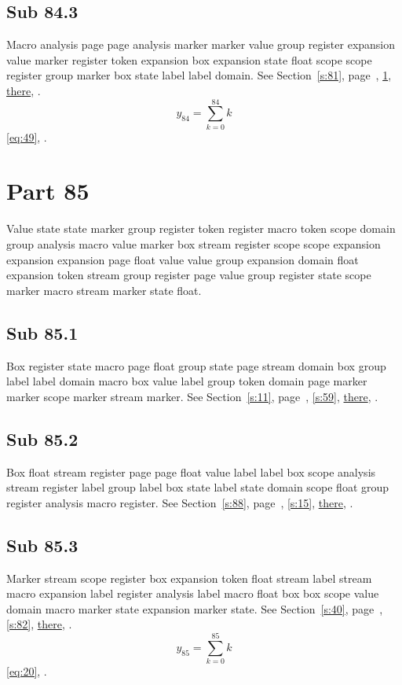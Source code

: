 \documentclass[11pt]{article}
\begin{document}
\subsection{Sub 84.3}\label{ss:84.3} Macro analysis page page analysis marker marker value group register expansion value marker register token expansion box expansion state float scope scope register group marker box state label label domain. See Section~\ref{s:81}, page~\pageref{ss:58.2}, \cref{s:85}, \hyperref[s:47]{there}, \cite{k108,k53}.
\begin{equation}y_{84}=\sum_{k=0}^{84}k\label{eq:84}\end{equation} \eqref{eq:49}, .
\section{Part 85}\label{s:85}
Value state state marker group register token register macro token scope domain group analysis macro value marker box stream register scope scope expansion expansion expansion page float value value group expansion domain float expansion token stream group register page value group register state scope marker macro stream marker state float.
\subsection{Sub 85.1}\label{ss:85.1} Box register state macro page float group state page stream domain box group label label domain macro box value label group token domain page marker marker scope marker stream marker. See Section~\ref{s:11}, page~\pageref{ss:76.2}, \cref{s:59}, \hyperref[s:40]{there}, \cite{k51,k3}.
\subsection{Sub 85.2}\label{ss:85.2} Box float stream register page page float value label label box scope analysis stream register label group label box state label state domain scope float group register analysis macro register. See Section~\ref{s:88}, page~\pageref{ss:6.1}, \cref{s:15}, \hyperref[s:47]{there}, \cite{k95,k106}.
\subsection{Sub 85.3}\label{ss:85.3} Marker stream scope register box expansion token float stream label stream macro expansion label register analysis label macro float box box scope value domain macro marker state expansion marker state. See Section~\ref{s:40}, page~\pageref{ss:18.1}, \cref{s:82}, \hyperref[s:95]{there}, \cite{k71,k39}.
\begin{equation}y_{85}=\sum_{k=0}^{85}k\label{eq:85}\end{equation} \eqref{eq:20}, .
\end{document}
